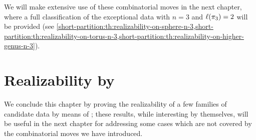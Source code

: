 We will make extensive use of these combinatorial moves in the next chapter, where a full classification of the exceptional data with $n=3$ and $\ell(\pi_3)=2$ will be provided (see \cref{short-partition:th:realizability-on-sphere-n-3,short-partition:th:realizability-on-torus-n-3,short-partition:th:realizability-on-higher-genus-n-3}).


\section{Realizability by \texorpdfstring{\dessins{}}{dessins d'enfant}}

We conclude this chapter by proving the realizability of a few families of candidate data by means of \dessins{}; these results, while interesting by themselves, will be useful in the next chapter for addressing some cases which are not covered by the combinatorial moves we have introduced.

